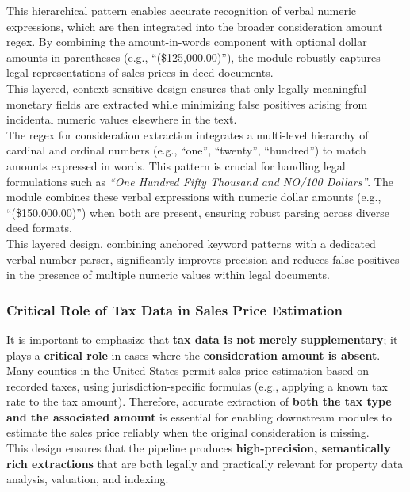 \documentclass{article}
\begin{document}
This hierarchical pattern enables accurate recognition of verbal numeric expressions, which are then integrated into the broader consideration amount regex. By combining the amount-in-words component with optional dollar amounts in parentheses (e.g., ``(\$125,000.00)''), the module robustly captures legal representations of sales prices in deed documents. \\

This layered, context-sensitive design ensures that only legally meaningful monetary fields are extracted while minimizing false positives arising from incidental numeric values elsewhere in the text. \\


The regex for consideration extraction integrates a multi-level hierarchy of cardinal and ordinal numbers (e.g., ``one'', ``twenty'', ``hundred'') to match amounts expressed in words. This pattern is crucial for handling legal formulations such as \textit{``One Hundred Fifty Thousand and NO/100 Dollars''}. The module combines these verbal expressions with numeric dollar amounts (e.g., ``(\$150,000.00)'') when both are present, ensuring robust parsing across diverse deed formats. \\

This layered design, combining anchored keyword patterns with a dedicated verbal number parser, significantly improves precision and reduces false positives in the presence of multiple numeric values within legal documents.


\subsubsection{Critical Role of Tax Data in Sales Price Estimation}

It is important to emphasize that \textbf{tax data is not merely supplementary}; it plays a \textbf{critical role} in cases where the \textbf{consideration amount is absent}. Many counties in the United States permit sales price estimation based on recorded taxes, using jurisdiction-specific formulas (e.g., applying a known tax rate to the tax amount). \cite{nj_realty_transfer_fee} Therefore, accurate extraction of \textbf{both the tax type and the associated amount} is essential for enabling downstream modules to estimate the sales price reliably when the original consideration is missing. \\

This design ensures that the pipeline produces \textbf{high-precision, semantically rich extractions} that are both legally and practically relevant for property data analysis, valuation, and indexing.
\end{document}
